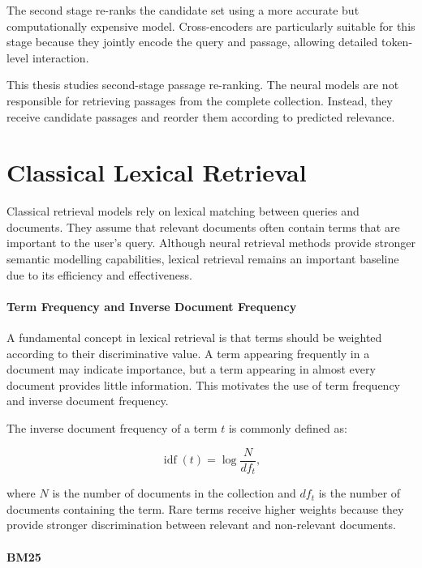 The second stage re-ranks the candidate set using a more accurate but computationally expensive model. Cross-encoders are particularly suitable for this stage because they jointly encode the query and passage, allowing detailed token-level interaction.

This thesis studies second-stage passage re-ranking. The neural models are not responsible for retrieving passages from the complete collection. Instead, they receive candidate passages and reorder them according to predicted relevance.

\section{Classical Lexical Retrieval}
\label{sec:background_lexical}

Classical retrieval models rely on lexical matching between queries and documents. They assume that relevant documents often contain terms that are important to the user's query. Although neural retrieval methods provide stronger semantic modelling capabilities, lexical retrieval remains an important baseline due to its efficiency and effectiveness.

\paragraph{Term Frequency and Inverse Document Frequency}
\label{subsec:background_tfidf}

A fundamental concept in lexical retrieval is that terms should be weighted according to their discriminative value. A term appearing frequently in a document may indicate importance, but a term appearing in almost every document provides little information. This motivates the use of term frequency and inverse document frequency.

The inverse document frequency of a term $t$ is commonly defined as:

\begin{equation}
    \operatorname{idf}(t) =
    \log \frac{N}{df_t},
\end{equation}

where $N$ is the number of documents in the collection and $df_t$ is the number of documents containing the term. Rare terms receive higher weights because they provide stronger discrimination between relevant and non-relevant documents.

\paragraph{BM25}
\label{subsec:background_bm25}

